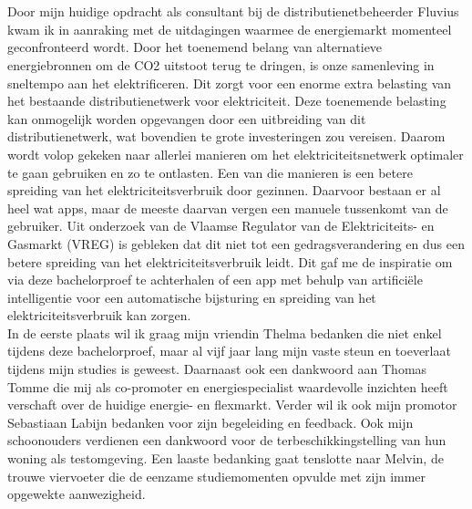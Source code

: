 
\chapter*{}%
\label{ch:voorwoord}


Door mijn huidige opdracht als consultant bij de distributienetbeheerder Fluvius kwam ik in aanraking met de uitdagingen waarmee de energiemarkt momenteel geconfronteerd wordt. Door het toenemend belang van alternatieve energiebronnen om de CO2 uitstoot terug te dringen, is onze samenleving in sneltempo aan het elektrificeren. Dit zorgt voor een enorme extra belasting van het bestaande distributienetwerk voor elektriciteit. Deze toenemende belasting kan onmogelijk worden opgevangen door een uitbreiding van dit distributienetwerk, wat bovendien te grote investeringen zou vereisen. Daarom wordt volop gekeken naar allerlei manieren om het elektriciteitsnetwerk optimaler te gaan gebruiken en zo te ontlasten. Een van die manieren is een betere spreiding van het elektriciteitsverbruik door gezinnen. Daarvoor bestaan er al heel wat apps, maar de meeste daarvan vergen een manuele tussenkomt van de gebruiker. Uit onderzoek van de Vlaamse Regulator van de Elektriciteits- en Gasmarkt (VREG) is gebleken dat dit niet tot een gedragsverandering en dus een betere spreiding van het elektriciteitsverbruik leidt. Dit gaf me de inspiratie om via deze bachelorproef te achterhalen of een app met behulp van artificiële intelligentie voor een automatische bijsturing en spreiding van het elektriciteitsverbruik kan zorgen. \\

In de eerste plaats wil ik graag mijn vriendin Thelma bedanken die niet enkel tijdens deze bachelorproef, maar al vijf jaar lang mijn vaste steun en toeverlaat tijdens mijn studies is geweest. Daarnaast ook een dankwoord aan Thomas Tomme die mij als co-promoter en energiespecialist waardevolle inzichten heeft verschaft over de huidige energie- en flexmarkt. Verder wil ik ook mijn promotor Sebastiaan Labijn bedanken voor zijn begeleiding en feedback. Ook mijn schoonouders verdienen een dankwoord voor de terbeschikkingstelling van hun woning als testomgeving. Een laaste bedanking gaat tenslotte naar Melvin, de trouwe viervoeter die de eenzame studiemomenten opvulde met zijn immer opgewekte aanwezigheid.